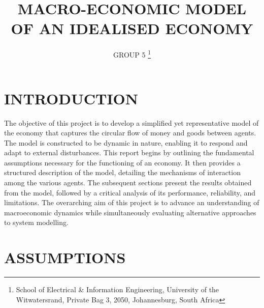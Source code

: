 \documentclass[10pt,twocolumn]{witseiepaper}
\begin{document}
\title{MACRO-ECONOMIC MODEL OF AN IDEALISED ECONOMY}

\author{GROUP 5
\thanks{School of Electrical \& Information Engineering, University of the
Witwatersrand, Private Bag 3, 2050, Johannesburg, South Africa}
}


%



\maketitle
\pagestyle{empty}


%
\section{INTRODUCTION}

The objective of this project is to develop a simplified yet representative model of the economy that captures the circular flow of money and goods between agents. The model is constructed to be dynamic in nature, enabling it to respond and adapt to external disturbances.  
This report begins by outlining the fundamental assumptions necessary for the functioning of an economy. It then provides a structured description of the model, detailing the mechanisms of interaction among the various agents. The subsequent sections present the results obtained from the model, followed by a critical analysis of its performance, reliability, and limitations.  
The overarching aim of this project is to advance an understanding of macroeconomic dynamics while simultaneously evaluating alternative approaches to system modelling.

\section{ASSUMPTIONS}
\end{document}

